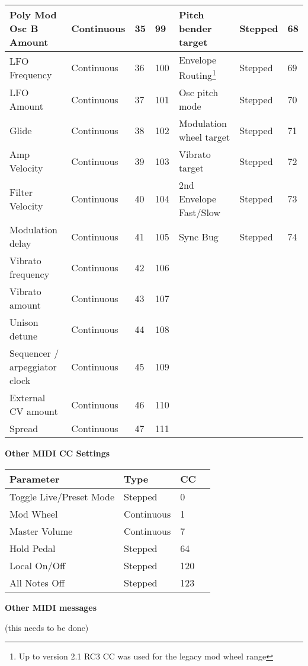 \begin{longtable}[l]{ p{5cm}|p{2cm}|p{1.5cm}|p{1.5cm}|p{5cm}|p{2cm}|p{1cm}}
Poly Mod Osc B Amount & Continuous & 35 & 99 & Pitch bender target & Stepped & 68 \\ \hline
LFO Frequency & Continuous & 36 & 100 & Envelope Routing\footnote{Up to version 2.1 RC3 CC was used for the legacy mod wheel range} & Stepped & 69 \\ \hline
LFO Amount & Continuous & 37 & 101 & Osc pitch mode & Stepped & 70 \\ \hline
Glide & Continuous & 38 & 102 & Modulation wheel target & Stepped & 71 \\ \hline
Amp Velocity & Continuous & 39 & 103 & Vibrato target & Stepped & 72 \\ \hline
Filter Velocity & Continuous & 40 & 104 &  2nd Envelope Fast/Slow & Stepped & 73 \\ \hline
Modulation delay & Continuous & 41 & 105 & Sync Bug & Stepped & 74 \\ \hline
Vibrato frequency & Continuous & 42 & 106 & & & \\ \hline
Vibrato amount & Continuous & 43 & 107 & &  & \\ \hline
Unison detune & Continuous & 44 & 108 & & &  \\ \hline
Sequencer / arpeggiator clock & Continuous & 45 & 109 &  &  &  \\ \hline
External CV amount & Continuous & 46 & 110 &  &  &  \\ \hline
Spread & Continuous & 47 & 111 &  &  &  \\ \hline 
\end{longtable}

\textbf{Other MIDI CC Settings}

\begin{longtable}[l]{ p{5cm}|p{2cm}|p{2cm}|p{1cm}} 
\textbf{Parameter} & \textbf{Type} & \textbf{ CC} \\ \hline
Toggle Live/Preset Mode & Stepped & 0 & \\ \hline
Mod Wheel & Continuous & 1 & \\ \hline
Master Volume & Continuous & 7 & \\ \hline
Hold Pedal & Stepped & 64 & \\ \hline
Local On/Off & Stepped & 120 & \\ \hline
All Notes Off & Stepped & 123 & \\ \hline
\end{longtable}

\textbf{Other MIDI messages}

(this needs to be done)

